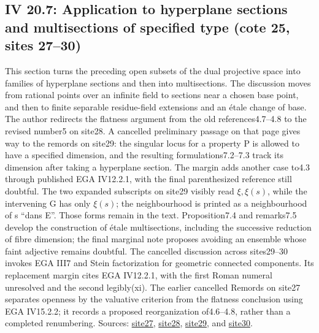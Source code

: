 \subsection*{IV 20.7: Application to hyperplane sections and multisections of specified type (cote 25, sites 27--30)}
This section turns the preceding open subsets of the dual projective space into families of hyperplane sections and then into multisections. The discussion moves from rational points over an infinite field to sections near a chosen base point, and then to finite separable residue-field extensions and an étale change of base. The author redirects the flatness argument from the old references4.7--4.8 to the revised number5 on site28. A cancelled preliminary passage on that page gives way to the remords on site29: the singular locus for a property P is allowed to have a specified dimension, and the resulting formulations7.2--7.3 track its dimension after taking a hyperplane section. The margin adds another case to4.3 through published EGA IV12.2.1, with the final parenthesized reference still doubtful. The two expanded subscripts on site29 visibly read $\xi,\xi(s)$, while the intervening G has only $\xi(s)$; the neighbourhood is printed as a neighbourhood of s ``dans E''. Those forms remain in the text. Proposition7.4 and remarks7.5 develop the construction of étale multisections, including the successive reduction of fibre dimension; the final marginal note proposes avoiding an ensemble whose faint adjective remains doubtful. The cancelled discussion across sites29--30 invokes EGA III7 and Stein factorization for geometric connected components. Its replacement margin cites EGA IV12.2.1, with the first Roman numeral unresolved and the second legibly(xi). The earlier cancelled Remords on site27 separates openness by the valuative criterion from the flatness conclusion using EGA IV15.2.2; it records a proposed reorganization of4.6--4.8, rather than a completed renumbering. Sources: \href{https://grothendieck.umontpellier.fr/web/viewer.html?file=../25.pdf\#page=28}{site27}, \href{https://grothendieck.umontpellier.fr/web/viewer.html?file=../25.pdf\#page=29}{site28}, \href{https://grothendieck.umontpellier.fr/web/viewer.html?file=../25.pdf\#page=30}{site29}, and \href{https://grothendieck.umontpellier.fr/web/viewer.html?file=../25.pdf\#page=31}{site30}.
